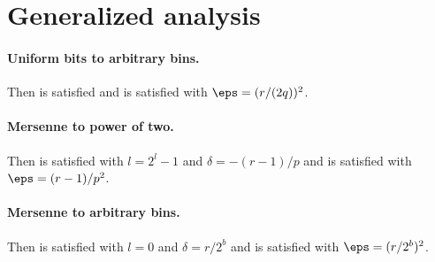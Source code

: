 \section{Generalized analysis}

\paragraph{Uniform bits to arbitrary bins.}
Then  is satisfied and  is
satisfied with $\eps = (r/(2q))^2$.

\paragraph{Mersenne to power of two.}
Then  is satisfied with $l = 2^l - 1$ and
$\delta = -(r - 1)/p$ and  is satisfied
with $\eps = (r - 1)/p^2$.

\paragraph{Mersenne to arbitrary bins.}
Then  is satisfied with $l = 0$ and
$\delta = r/2^b$ and  is satisfied
with $\eps = (r/2^b)^2$.


